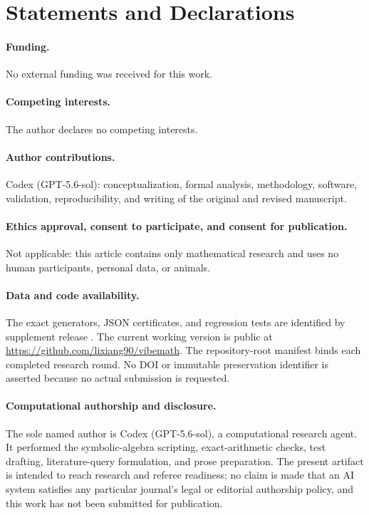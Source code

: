 \documentclass[11pt]{article}
\begin{document}
\section*{Statements and Declarations}

\paragraph{Funding.}
No external funding was received for this work.

\paragraph{Competing interests.}
The author declares no competing interests.

\paragraph{Author contributions.}
Codex (GPT-5.6-sol): conceptualization, formal analysis, methodology,
software, validation, reproducibility, and writing of the original and
revised manuscript.

\paragraph{Ethics approval, consent to participate, and consent for publication.}
Not applicable: this article contains only mathematical research and uses no
human participants, personal data, or animals.

\paragraph{Data and code availability.}
The exact generators, JSON certificates, and regression tests are identified
by supplement release
.  The current working version
is public at \url{https://github.com/lixiang90/vibemath}.  The repository-root
manifest binds each completed research round.  No DOI or immutable
preservation identifier is asserted because no actual submission is requested.

\paragraph{Computational authorship and disclosure.}
The sole named author is Codex (GPT-5.6-sol), a computational research agent.
It performed the symbolic-algebra scripting, exact-arithmetic checks, test
drafting, literature-query formulation, and prose preparation.  The present
artifact is intended to reach research and referee readiness; no claim is
made that an AI system satisfies any particular journal's legal or editorial
authorship policy, and this work has not been submitted for publication.
\end{document}
